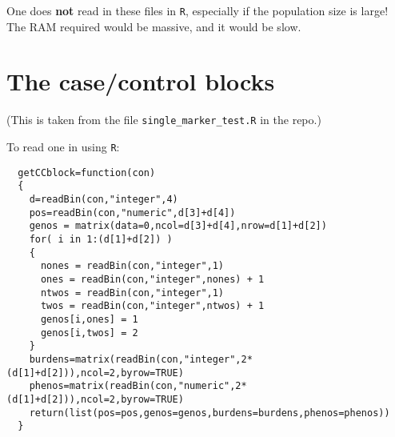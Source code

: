 \documentclass{article}
\begin{document}
One does \textbf{not} read in these files in \texttt{R}, especially if the population size is large!  The RAM required would be massive, and it would be slow.

\section*{The case/control blocks}

(This is taken from the file \texttt{single\_marker\_test.R} in the repo.)

To read one in using \texttt{R}:

\begin{lstlisting}
  getCCblock=function(con)
  {
    d=readBin(con,"integer",4)
    pos=readBin(con,"numeric",d[3]+d[4])
    genos = matrix(data=0,ncol=d[3]+d[4],nrow=d[1]+d[2])
    for( i in 1:(d[1]+d[2]) )
    {
      nones = readBin(con,"integer",1)
      ones = readBin(con,"integer",nones) + 1
      ntwos = readBin(con,"integer",1)
      twos = readBin(con,"integer",ntwos) + 1
      genos[i,ones] = 1
      genos[i,twos] = 2
    }
    burdens=matrix(readBin(con,"integer",2*(d[1]+d[2])),ncol=2,byrow=TRUE)
    phenos=matrix(readBin(con,"numeric",2*(d[1]+d[2])),ncol=2,byrow=TRUE)
    return(list(pos=pos,genos=genos,burdens=burdens,phenos=phenos))
  }
\end{lstlisting}
\end{document}
